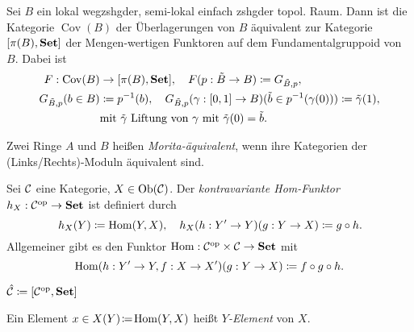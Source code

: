 \documentclass{cheat-sheet}
\DeclareMathOperator{\Cov}{Cov} %
\begin{document}

\begin{bsp}
  Sei $B$ ein lokal wegzshgder, semi-lokal einfach zshgder topol. Raum. Dann ist die Kategorie $\Cov(B)$ der Überlagerungen von $B$ äquivalent zur Kategorie $[\pi(B), \mathbf{Set}]$ der Mengen-wertigen Funktoren auf dem Fundamentalgruppoid von $B$. Dabei ist
  \begin{align*}
    F : \Cov(B) & \to [\pi(B), \SetC], \quad F(p : \tilde{B} \to B) \coloneqq G_{\tilde{B},p}, \\
    G_{\tilde{B},p}(b \in B) & \coloneqq p^{-1}(b), \quad G_{\tilde{B},p}(\gamma : \I \to B)(\tilde{b} \in p^{-1}(\gamma(0))) \coloneqq \tilde{\gamma}(1), \\
    & \text{mit $\tilde{\gamma}$ Liftung von $\gamma$ mit $\tilde{\gamma}(0) = \tilde{b}$}.
  \end{align*}
\end{bsp}



\begin{defn}
  Zwei Ringe $A$ und $B$ heißen \emph{Morita-äquivalent}, wenn ihre Kategorien der (Links/Rechts)-Moduln äquivalent sind.
\end{defn}


\begin{defn}
  Sei $\mathcal{C}$ eine Kategorie, $X \in \operatorname{Ob}(\mathcal{C})$. Der \emph{kontravariante Hom-Funktor} $h_X : \mathcal{C}^{\mathrm{op}} \to \mathbf{Set}$ ist definiert durch
  \[
    h_X(Y) \coloneqq \operatorname{Hom}(Y, X), \quad
    h_X(h : Y' \to Y)(g : Y \to X) \coloneqq g \circ h.
  \]
  Allgemeiner gibt es den Funktor $\operatorname{Hom} : \mathcal{C}^{\mathrm{op}} \times \mathcal{C} \to \mathbf{Set}$ mit
  \[
    \operatorname{Hom}(h : Y' \to Y, f : X \to X')(g : Y \to X) \coloneqq f \circ g \circ h.
  \]
\end{defn}

\begin{nota}
  $\hat{\mathcal{C}} \coloneqq [\mathcal{C}^{\mathrm{op}}, \mathbf{Set}]$
\end{nota}

\begin{defn}
  Ein Element $x \in X(Y) \!\coloneqq\! \operatorname{Hom}(Y, X)$ heißt \emph{$Y$-Element} von $X$.
\end{defn}
\end{document}
